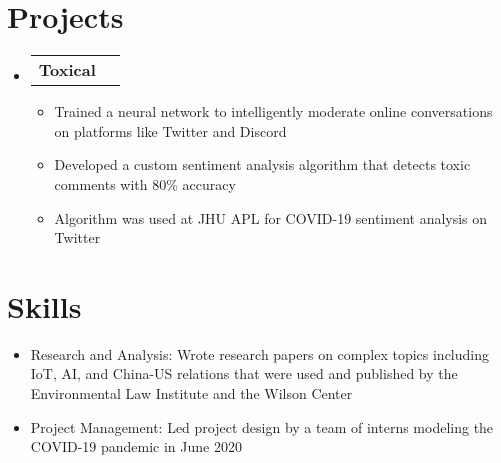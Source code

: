 \documentclass[letterpaper,11pt]{article}
\makeatletter
\newcommand{\resumeItem}[1]{
  \item\small{
    {#1} \vspace{-2pt}
  }
}
\newcommand{\resumeSubheadingTwo}[2]{
  \vspace{-1pt}\item
    \begin{tabular*}{0.97\textwidth}{l@{\extracolsep{\fill}}r}
      \textbf{#1} & #2 \\
    \end{tabular*}\vspace{-5pt}
}
\newcommand{\resumeSubItem}[2]{\resumeItem{#1}{#2}\vspace{-4pt}}
\newcommand{\resumeSubHeadingListStart}{\begin{itemize}[leftmargin=*]}
\newcommand{\resumeSubHeadingListEnd}{\end{itemize}}
\newcommand{\resumeItemListStart}{\begin{itemize}}
\newcommand{\resumeItemListEnd}{\end{itemize}\vspace{-5pt}}
\makeatother
\begin{document}
\section{Projects}
  \resumeSubHeadingListStart
    \resumeSubheadingTwo{Toxical}{}
        \resumeItemListStart
            \resumeItem{Trained a neural network to intelligently moderate online conversations on platforms like Twitter and Discord}
            \resumeItem{Developed a custom sentiment analysis algorithm that detects toxic comments with 80\% accuracy}
            \resumeItem{Algorithm was used at JHU APL for COVID-19 sentiment analysis on Twitter}
        \resumeItemListEnd
  \resumeSubHeadingListEnd

              
        

\section{Skills}
 \resumeSubHeadingListStart
    \resumeSubItem{Research and Analysis:}{Wrote research papers on complex topics including IoT, AI, and China-US relations that were used and published by the Environmental Law Institute and the Wilson Center}
    \resumeSubItem{Project Management:}{Led project design by a team of interns modeling the COVID-19 pandemic in June 2020}
 \resumeSubHeadingListEnd

\end{document}
